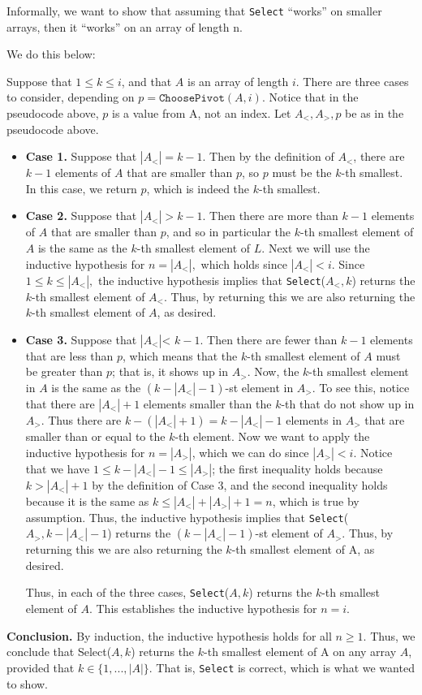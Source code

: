 \documentclass [12pt]{article}
\begin{document}
Informally, we want to show that assuming that \texttt{Select} ``works'' on smaller arrays, then it ``works'' on an array of length n. 

We do this below:

Suppose that $1 \leq k \leq i$, and that $A$ is an array of length $i$. There are three cases to consider,
depending on $p = \texttt{ChoosePivot}(A, i)$. Notice that in the pseudocode above, $p$ is a value from A, not an index. Let $A_<, A_>, p$ be as in the pseudocode above.

\begin{itemize}
\item \textbf{Case 1.} Suppose that $|A_<| = k -1$. Then by the definition of $A_<$, there are $k -1$ elements of $A$ that are smaller than $p$, so $p$ must be the $k$-th smallest. In this case, we return $p$, which is indeed the $k$-th smallest.
\item \textbf{Case 2.} Suppose that $|A_<| > k -1$. Then there are more than $k -1$ elements of $A$ that are smaller than $p$, and so in particular the $k$-th smallest element of $A$ is the same as the $k$-th smallest element of $L$. Next we will use the inductive hypothesis for $n = |A_<|,$ which holds since $|A_<| < i$. Since $1 \leq k \leq |A_<|,$ the inductive hypothesis implies that \texttt{Select}($A_<, k$) returns the $k$-th smallest element of $A_<$. Thus, by returning this we are also returning the $k$-th smallest element of $A$, as desired.
\item \textbf{Case 3.} Suppose that $|A_<| $< $k -1$. Then there are fewer than $k -1$ elements that are less than $p$, which means that the $k$-th smallest element of $A$ must be greater than $p$; that is, it shows up in $A_>$. Now, the $k$-th smallest element in $A$ is the same as the $(k -|A_<| -1)$-st element in $A_>$. To see this, notice that there are $|A_<| + 1$ elements smaller than the $k$-th that do not show up in $A_>$. Thus there are $k -(|A_<| + 1) = k -|A_<| -1$ elements in $A_>$ that are smaller than or equal to the $k$-th element. Now we want to apply the inductive hypothesis for $n = |A_>|$, which we can do since $|A_>| < i$. Notice that we have $1 \leq k -|A_<| -1 \leq |A_>|$; the first inequality holds because $k > |A_<| + 1$ by the definition of Case 3, and the second inequality holds because it is the same as $k \leq |A_<| + |A_>| + 1 = n$, which is true by assumption. Thus, the inductive hypothesis implies that \texttt{Select}($A_>, k -|A_<| -1$) returns the $(k -|A_<| -1)$-st element of $A_>$. Thus, by returning this we are also returning the $k$-th smallest element of A, as desired.

Thus, in each of the three cases, \texttt{Select}($A, k$) returns the $k$-th smallest element of $A$. This establishes the inductive hypothesis for $n = i$.
\end{itemize}

\textbf{Conclusion.} By induction, the inductive hypothesis holds for all $n \geq 1$. Thus, we conclude that Select($A, k$) returns the $k$-th smallest element of A on any array $A$, provided that $k \in \{1, . . . , |A|\}$. That is, \texttt{Select} is correct, which is what we wanted to show.
\end{document}
